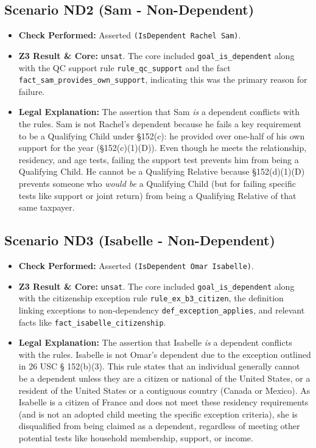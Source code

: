 \documentclass[11pt, letterpaper]{article}
\begin{document}
\subsection{Scenario ND2 (Sam - Non-Dependent)}
\begin{itemize}
    \item \textbf{Check Performed:} Asserted \texttt{(IsDependent Rachel Sam)}.
    \item \textbf{Z3 Result \& Core:} \texttt{unsat}. The core included \texttt{goal\_is\_dependent} along with the QC support rule \texttt{rule\_qc\_support} and the fact \texttt{fact\_sam\_provides\_own\_support}, indicating this was the primary reason for failure.
    \item \textbf{Legal Explanation:} The assertion that Sam \textit{is} a dependent conflicts with the rules. Sam is not Rachel's dependent because he fails a key requirement to be a Qualifying Child under §152(c): he provided over one-half of his own support for the year (§152(c)(1)(D)). Even though he meets the relationship, residency, and age tests, failing the support test prevents him from being a Qualifying Child. He cannot be a Qualifying Relative because §152(d)(1)(D) prevents someone who \textit{would be} a Qualifying Child (but for failing specific tests like support or joint return) from being a Qualifying Relative of that same taxpayer.
\end{itemize}

\subsection{Scenario ND3 (Isabelle - Non-Dependent)}
\begin{itemize}
    \item \textbf{Check Performed:} Asserted \texttt{(IsDependent Omar Isabelle)}.
    \item \textbf{Z3 Result \& Core:} \texttt{unsat}. The core included \texttt{goal\_is\_dependent} along with the citizenship exception rule \texttt{rule\_ex\_b3\_citizen}, the definition linking exceptions to non-dependency \texttt{def\_exception\_applies}, and relevant facts like \texttt{fact\_isabelle\_citizenship}.
    \item \textbf{Legal Explanation:} The assertion that Isabelle \textit{is} a dependent conflicts with the rules. Isabelle is not Omar's dependent due to the exception outlined in 26 USC § 152(b)(3). This rule states that an individual generally cannot be a dependent unless they are a citizen or national of the United States, or a resident of the United States or a contiguous country (Canada or Mexico). As Isabelle is a citizen of France and does not meet these residency requirements (and is not an adopted child meeting the specific exception criteria), she is disqualified from being claimed as a dependent, regardless of meeting other potential tests like household membership, support, or income.
\end{itemize}
\end{document}
